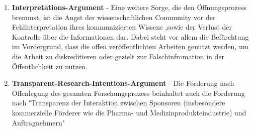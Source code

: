 \begin{enumerate}
\item \textbf{Interpretations-Argument} - Eine weitere Sorge, die den Öffnungsprozess bremmst, ist die Angst der wissenschaftlichen Community vor der Fehlinterpretation ihres kommunizierten Wissens ,sowie der Verlust der Kontrolle über die Informationen\cite{gibbons_1994} dar. Dabei steht vor allem die Befürchtung im Vordergrund, dass die offen veröffentlichten Arbeiten genutzt werden, um die Arbeit zu diskreditieren oder gezielt zur Falschinfromation in der Öffentlichkeit zu nutzen.
\item \textbf{Transparent-Research-Intentions-Argument} - Die Forderung nach Offenlegung des gesamten Forschungsprozess beinhaltet auch die Forderung nach "Transparenz der Interaktion zwischen Sponsoren (insbesondere kommerzielle Förderer wie die Pharma- und Medizinprodukteindustrie) und Auftragnehmern" \cite{Stengel_2013}
\end{enumerate}

